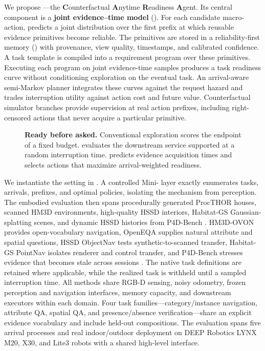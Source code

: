 We propose \method{}---the \textbf{C}ounterfactual \textbf{A}nytime \textbf{R}eadiness \textbf{A}gent.
Its central component is a \textbf{joint evidence--time model} (\jet{}).
For each candidate macro-action, \jet{} predicts a joint distribution over the first prefix at which reusable evidence primitives become reliable.
The primitives are stored in a reliability-first memory (\rfm{}) with provenance, view quality, timestamps, and calibrated confidence.
A task template is compiled into a requirement program over these primitives.
Executing each program on joint evidence-time samples produces a task readiness curve without conditioning exploration on the eventual task.
An arrival-aware semi-Markov planner integrates these curves against the request hazard and trades interruption utility against action cost and future value.
Counterfactual simulator branches provide supervision at real action prefixes, including right-censored actions that never acquire a particular primitive.

\begin{figure}[t]
  \centering
  \caption{\textbf{Ready before asked.}
  Conventional exploration scores the endpoint of a fixed budget.
  \taskname{} evaluates the downstream service supported at a random interruption time.
  \method{} predicts evidence acquisition times and selects actions that maximize arrival-weighted readiness.}
  \label{fig:overview}
\end{figure}

We instantiate the setting in \bench{}.
A controlled Mini-\taskname{} layer exactly enumerates tasks, arrivals, prefixes, and optimal policies, isolating the mechanism from perception.
The embodied evaluation then spans procedurally generated ProcTHOR houses, scanned HM3D environments, high-quality HSSD interiors, Habitat-GS Gaussian-splatting scenes, and dynamic HSSD histories from P4D-Bench
\citep{savva2019habitat,ramakrishnan2021hm3d,deitke2022procthor,khanna2024hssd,xia2026habitatgs}.
HM3D-OVON provides open-vocabulary navigation, OpenEQA supplies natural attribute and spatial questions, HSSD ObjectNav tests synthetic-to-scanned transfer, Habitat-GS PointNav isolates renderer and control transfer, and P4D-Bench stresses evidence that becomes stale across sessions
\citep{yokoyama2024hm3dovon,majumdar2024openeqa}.
The native task definitions are retained where applicable, while the realized task is withheld until a sampled interruption time.
All methods share RGB-D sensing, noisy odometry, frozen perception and navigation interfaces, memory capacity, and downstream executors within each domain.
Four task families---category/instance navigation, attribute QA, spatial QA, and presence/absence verification---share an explicit evidence vocabulary and include held-out compositions.
The evaluation spans five arrival processes and real indoor/outdoor deployment on DEEP Robotics LYNX M20, X30, and Lite3 robots with a shared high-level interface.

